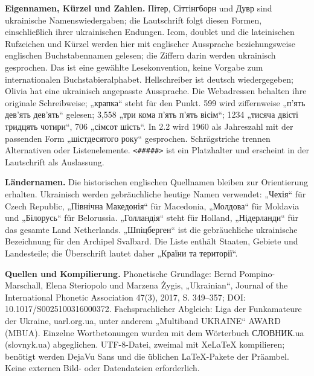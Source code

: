 \documentclass[a4paper,landscape,10pt]{article}
\begin{document}
\medskip
\textbf{Eigennamen, Kürzel und Zahlen.} Пітер, Сіттінгборн und Дувр sind ukrainische
Namenswiedergaben; die Lautschrift folgt diesen Formen, einschließlich ihrer ukrainischen Endungen.
Icom, doublet und die lateinischen Rufzeichen und Kürzel werden hier mit englischer Aussprache
beziehungsweise englischen Buchstabennamen gelesen; die Ziffern darin werden ukrainisch gesprochen.
Das ist eine gewählte Lesekonvention, keine Vorgabe zum internationalen Buchstabieralphabet.
Hellschreiber ist deutsch wiedergegeben; Olivia hat eine ukrainisch angepasste Aussprache.
Die Webadressen behalten ihre originale Schreibweise; „крапка“ steht für den Punkt.
599 wird ziffernweise „п'ять дев'ять дев'ять“ gelesen; 3,558 „три кома п'ять п'ять вісім“;
1234 „тисяча двісті тридцять чотири“, 706 „сімсот шість“.
In 2.2 wird 1960 als Jahreszahl mit der passenden Form „шістдесятого року“ gesprochen.
Schrägstriche trennen Alternativen oder Listenelemente. \texttt{<\#\#\#\#\#>} ist ein Platzhalter
und erscheint in der Lautschrift als Auslassung.

\medskip
\textbf{Ländernamen.} Die historischen englischen Quellnamen bleiben zur Orientierung erhalten.
Ukrainisch werden gebräuchliche heutige Namen verwendet: „Чехія“ für Czech Republic,
„Північна Македонія“ für Macedonia, „Молдова“ für Moldavia und „Білорусь“ für Belorussia.
„Голландія“ steht für Holland, „Нідерланди“ für das gesamte Land Netherlands.
„Шпіцберген“ ist die gebräuchliche ukrainische Bezeichnung für den Archipel Svalbard.
Die Liste enthält Staaten, Gebiete und Landesteile; die Überschrift lautet daher „Країни та території“.

\medskip
\textbf{Quellen und Kompilierung.} Phonetische Grundlage: Bernd Pompino-Marschall, Elena Steriopolo
und Marzena Żygis, „Ukrainian“, Journal of the International Phonetic Association 47(3), 2017,
S. 349--357; DOI: 10.1017/S0025100316000372. Fachsprachlicher Abgleich: Liga der Funkamateure
 der Ukraine, uarl.org.ua, unter anderem „Multiband UKRAINE“ AWARD (MBUA).
Einzelne Wortbetonungen wurden mit dem Wörterbuch СЛОВНИК.ua (slovnyk.ua) abgeglichen.
UTF-8-Datei, zweimal mit XeLaTeX kompilieren; benötigt werden DejaVu Sans und die üblichen
LaTeX-Pakete der Präambel. Keine externen Bild- oder Datendateien erforderlich.
\end{document}
